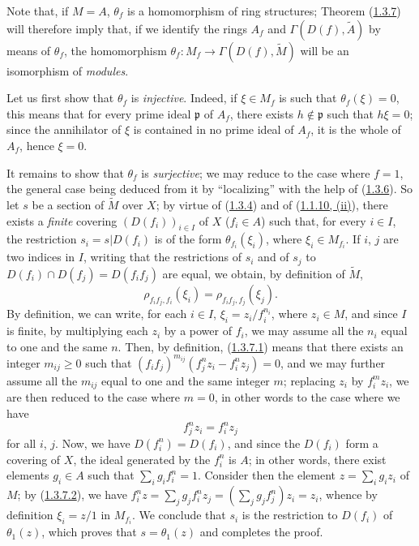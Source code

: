 Note that, if $M=A$, $\theta_f$ is a homomorphism of ring
structures; Theorem (\hyperref[I.1.3.7]{1.3.7}) will therefore imply that,
if we identify the rings $A_f$ and $\Gamma(D(f),\widetilde{A})$ by means of
$\theta_f$, the homomorphism
$\theta_f:M_f\to\Gamma(D(f),\widetilde{M})$ will be an isomorphism of
\emph{modules}.

Let us first show that $\theta_f$ is \emph{injective}. Indeed, if
$\xi\in M_f$ is such that $\theta_f(\xi)=0$, this means that for every prime
ideal $\mathfrak{p}$ of $A_f$, there exists $h\notin\mathfrak{p}$ such that
$h\xi=0$; since the annihilator of $\xi$ is contained in no prime ideal
of $A_f$, it is the whole of $A_f$, hence $\xi=0$.

It remains to show that $\theta_f$ is \emph{surjective}; we may reduce to
the case where $f=1$, the general case being deduced from it by ``localizing''
with the help of (\hyperref[I.1.3.6]{1.3.6}). So let $s$ be a section of
$\widetilde{M}$ over $X$; by virtue of (\hyperref[I.1.3.4]{1.3.4}) and of
(\hyperref[I.1.1.10]{1.1.10, (ii)}), there exists a \emph{finite}
covering $(D(f_i))_{i\in I}$ of $X$ ($f_i\in A$) such that, for every
$i\in I$, the restriction $s_i=s|D(f_i)$ is of the form
$\theta_{f_i}(\xi_i)$, where $\xi_i\in M_{f_i}$. If $i$, $j$ are two indices
in $I$, writing that the restrictions of $s_i$ and of $s_j$ to
$D(f_i)\cap D(f_j)=D(f_i f_j)$ are equal, we obtain, by definition of
$\widetilde{M}$,
\begin{equation}
  \rho_{f_i f_j,f_i}(\xi_i)=\rho_{f_i f_j,f_j}(\xi_j).
  \tag{1.3.7.1}\label{I.1.3.7.1}
\end{equation}
By definition, we can write, for each $i\in I$,
$\xi_i=z_i/f_i^{n_i}$, where $z_i\in M$, and since $I$ is finite, by
multiplying each $z_i$ by a power of $f_i$, we may assume all the $n_i$
equal to one and the same $n$. Then, by definition,
(\hyperref[I.1.3.7.1]{1.3.7.1}) means that there exists an integer
$m_{ij}\geq0$ such that $(f_i f_j)^{m_{ij}}(f_j^n z_i-f_i^n z_j)=0$, and we
may further assume all the $m_{ij}$ equal to one and the same integer $m$;
replacing $z_i$ by $f_i^m z_i$, we are then reduced to the case where $m=0$,
in other words to the case where we have
\begin{equation}
  f_j^n z_i=f_i^n z_j
  \tag{1.3.7.2}\label{I.1.3.7.2}
\end{equation}
for all $i$, $j$. Now, we have $D(f_i^n)=D(f_i)$, and since the $D(f_i)$
form a covering of $X$, the ideal generated by the $f_i^n$ is $A$;
in other words, there exist elements $g_i\in A$ such that
$\sum_i g_i f_i^n=1$. Consider then the element
$z=\sum_i g_i z_i$ of $M$; by (\hyperref[I.1.3.7.2]{1.3.7.2}), we have
$f_i^n z=\sum_j g_j f_i^n z_j=(\sum_j g_j f_j^n)z_i=z_i$, whence by
definition $\xi_i=z/1$ in $M_{f_i}$. We conclude
that $s_i$ is the restriction to $D(f_i)$ of $\theta_1(z)$, which proves
that $s=\theta_1(z)$ and completes the proof.

